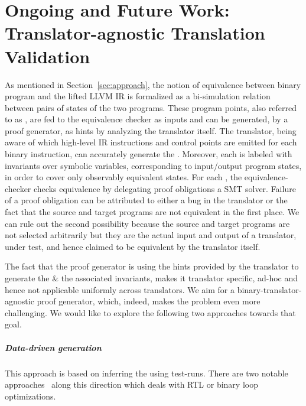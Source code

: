 \chapter{Ongoing and Future Work: Translator-agnostic Translation
  Validation}\label{sec:problem} As mentioned in Section~\ref{sec:approach},
  the notion of equivalence between  binary program and the lifted LLVM IR is
  formalized as a bi-simulation relation~\cite{Sangiorgi:2011} between pairs of
  states of the two programs. These program points, also referred to as
  \syncps, are fed to the equivalence checker as inputs and can
  be generated, by a proof generator,  as hints by analyzing the translator
  itself. The translator, being aware of which high-level IR instructions and
  control points are emitted for each binary instruction, can accurately
  generate the \syncps. Moreover, each \syncp is
  labeled with invariants over symbolic variables, corresponding to
  input/output program states, in order to cover only observably equivalent
  states. For each \syncp, the equivalence-checker checks
  equivalence by delegating proof obligations a SMT solver. Failure of a proof
  obligation can be attributed to either a bug in the translator or  the fact
  that the source and target programs are not equivalent in the first place. We
  can rule out the second possibility because the source and target programs
  are not selected arbitrarily but they are the actual input and output of a
  translator, under test, and hence claimed to be equivalent by the translator
  itself.
 
The fact that the proof generator is using the hints provided by the translator
to  generate the \syncps \& the associated  invariants,  makes it  translator specific, ad-hoc and hence not applicable
uniformly across translators. We aim for a  binary-translator-agnostic proof
generator, which, indeed, makes the problem  even more challenging. We would
like to explore the following two approaches towards that goal.

\paragraph{\textbf{Data-driven \syncp generation}} This approach
is based on inferring the \syncps using test-runs. There are two
notable approaches~\cite{Iman2005,DDEC:OOPSLA:2013} along this direction which
deals with RTL or binary loop optimizations.

